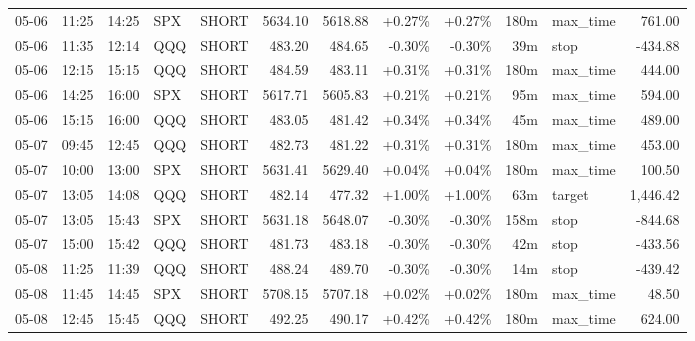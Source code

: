 \documentclass[11pt,a4paper,twoside]{article}
\begin{document}
\begin{center}
\begin{longtable}{>{\color{txtmain}}l l l l l r r r r r >{\color{txtmain}}l r}
05-06 & 11:25 & 14:25 & SPX & SHORT & 5634.10 & 5618.88 & \textcolor{wingreen}{+0.27\%} & \textcolor{wingreen}{+0.27\%} & 180m & max\_time & \textcolor{wingreen}{761.00} \\
05-06 & 11:35 & 12:14 & QQQ & SHORT & 483.20 & 484.65 & \textcolor{lossred}{-0.30\%} & \textcolor{lossred}{-0.30\%} & 39m & stop & \textcolor{lossred}{-434.88} \\
05-06 & 12:15 & 15:15 & QQQ & SHORT & 484.59 & 483.11 & \textcolor{wingreen}{+0.31\%} & \textcolor{wingreen}{+0.31\%} & 180m & max\_time & \textcolor{wingreen}{444.00} \\
05-06 & 14:25 & 16:00 & SPX & SHORT & 5617.71 & 5605.83 & \textcolor{wingreen}{+0.21\%} & \textcolor{wingreen}{+0.21\%} & 95m & max\_time & \textcolor{wingreen}{594.00} \\
05-06 & 15:15 & 16:00 & QQQ & SHORT & 483.05 & 481.42 & \textcolor{wingreen}{+0.34\%} & \textcolor{wingreen}{+0.34\%} & 45m & max\_time & \textcolor{wingreen}{489.00} \\
05-07 & 09:45 & 12:45 & QQQ & SHORT & 482.73 & 481.22 & \textcolor{wingreen}{+0.31\%} & \textcolor{wingreen}{+0.31\%} & 180m & max\_time & \textcolor{wingreen}{453.00} \\
05-07 & 10:00 & 13:00 & SPX & SHORT & 5631.41 & 5629.40 & \textcolor{wingreen}{+0.04\%} & \textcolor{wingreen}{+0.04\%} & 180m & max\_time & \textcolor{wingreen}{100.50} \\
05-07 & 13:05 & 14:08 & QQQ & SHORT & 482.14 & 477.32 & \textcolor{wingreen}{+1.00\%} & \textcolor{wingreen}{+1.00\%} & 63m & target & \textcolor{wingreen}{1,446.42} \\
05-07 & 13:05 & 15:43 & SPX & SHORT & 5631.18 & 5648.07 & \textcolor{lossred}{-0.30\%} & \textcolor{lossred}{-0.30\%} & 158m & stop & \textcolor{lossred}{-844.68} \\
05-07 & 15:00 & 15:42 & QQQ & SHORT & 481.73 & 483.18 & \textcolor{lossred}{-0.30\%} & \textcolor{lossred}{-0.30\%} & 42m & stop & \textcolor{lossred}{-433.56} \\
05-08 & 11:25 & 11:39 & QQQ & SHORT & 488.24 & 489.70 & \textcolor{lossred}{-0.30\%} & \textcolor{lossred}{-0.30\%} & 14m & stop & \textcolor{lossred}{-439.42} \\
05-08 & 11:45 & 14:45 & SPX & SHORT & 5708.15 & 5707.18 & \textcolor{wingreen}{+0.02\%} & \textcolor{wingreen}{+0.02\%} & 180m & max\_time & \textcolor{wingreen}{48.50} \\
05-08 & 12:45 & 15:45 & QQQ & SHORT & 492.25 & 490.17 & \textcolor{wingreen}{+0.42\%} & \textcolor{wingreen}{+0.42\%} & 180m & max\_time & \textcolor{wingreen}{624.00} \\

\end{longtable}
\end{center}
\end{document}
